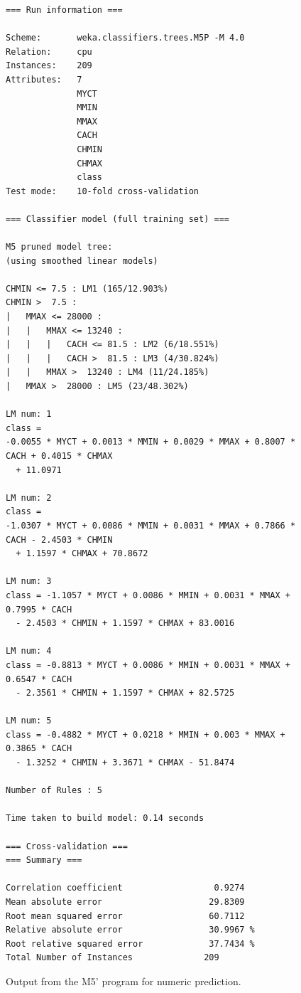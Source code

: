 \begin{figure}[!p]
\begin{mdframed}[innermargin=-1cm]
\begin{Verbatim}[fontsize=\footnotesize]
=== Run information ===

Scheme:       weka.classifiers.trees.M5P -M 4.0
Relation:     cpu
Instances:    209
Attributes:   7
              MYCT
              MMIN
              MMAX
              CACH
              CHMIN
              CHMAX
              class
Test mode:    10-fold cross-validation

=== Classifier model (full training set) ===

M5 pruned model tree:
(using smoothed linear models)

CHMIN <= 7.5 : LM1 (165/12.903%)
CHMIN >  7.5 : 
|   MMAX <= 28000 : 
|   |   MMAX <= 13240 : 
|   |   |   CACH <= 81.5 : LM2 (6/18.551%)
|   |   |   CACH >  81.5 : LM3 (4/30.824%)
|   |   MMAX >  13240 : LM4 (11/24.185%)
|   MMAX >  28000 : LM5 (23/48.302%)

LM num: 1
class = 
-0.0055 * MYCT + 0.0013 * MMIN + 0.0029 * MMAX + 0.8007 * CACH + 0.4015 * CHMAX 
  + 11.0971

LM num: 2
class = 
-1.0307 * MYCT + 0.0086 * MMIN + 0.0031 * MMAX + 0.7866 * CACH - 2.4503 * CHMIN 
  + 1.1597 * CHMAX + 70.8672

LM num: 3
class = -1.1057 * MYCT + 0.0086 * MMIN + 0.0031 * MMAX + 0.7995 * CACH 
  - 2.4503 * CHMIN + 1.1597 * CHMAX + 83.0016

LM num: 4
class = -0.8813 * MYCT + 0.0086 * MMIN + 0.0031 * MMAX + 0.6547 * CACH 
  - 2.3561 * CHMIN + 1.1597 * CHMAX + 82.5725

LM num: 5
class = -0.4882 * MYCT + 0.0218 * MMIN + 0.003 * MMAX + 0.3865 * CACH 
  - 1.3252 * CHMIN + 3.3671 * CHMAX - 51.8474

Number of Rules : 5

Time taken to build model: 0.14 seconds

=== Cross-validation ===
=== Summary ===

Correlation coefficient                  0.9274
Mean absolute error                     29.8309
Root mean squared error                 60.7112
Relative absolute error                 30.9967 %
Root relative squared error             37.7434 %
Total Number of Instances              209
\end{Verbatim}
\end{mdframed}
\caption{\label{fig:m5p_output}Output from the M5' program for numeric prediction.}
\end{figure}

